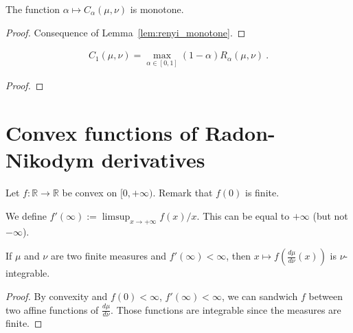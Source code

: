 \begin{lemma}[Monotonicity]
  \label{lem:chernoff_mono}
  The function $\alpha \mapsto C_\alpha(\mu, \nu)$ is monotone.
\end{lemma}

\begin{proof}
Consequence of Lemma~\ref{lem:renyi_monotone}.
\end{proof}


\begin{lemma}
  \label{lem:chernoff_eq_max_renyi}
  \begin{align*}
  C_1(\mu, \nu) = \max_{\alpha\in [0,1]} (1 - \alpha)R_\alpha(\mu, \nu) \: .
  \end{align*}
\end{lemma}

\begin{proof}%
\uses{}
\end{proof}



\chapter{Convex functions of Radon-Nikodym derivatives}

Let $f : \mathbb{R} \to \mathbb{R}$ be convex on $[0, +\infty)$. Remark that $f(0)$ is finite.

\begin{definition}
  \label{def:derivAtTop}
  \leanok
  We define $f'(\infty) := \limsup_{x \to + \infty} f(x)/x$. This can be equal to $+\infty$ (but not $-\infty$).
\end{definition}

\begin{lemma}
  \label{lem:integrable_f_rnDeriv_of_derivAtTop_ne_top}
  \leanok
  If $\mu$ and $\nu$ are two finite measures and $f'(\infty) < \infty$, then $x \mapsto f\left(\frac{d\mu}{d\nu}(x)\right)$ is $\nu$-integrable. 
\end{lemma}

\begin{proof} \leanok
By convexity and $f(0) < \infty$, $f'(\infty)<\infty$, we can sandwich $f$ between two affine functions of $\frac{d\mu}{d\nu}$.
Those functions are integrable since the measures are finite.
\end{proof}

